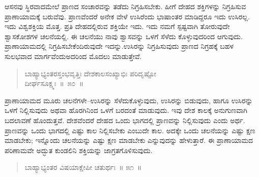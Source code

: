 \vspace{-0.25cm}


\vspace{0.1cm}

ಆಸನವು ಸ್ಥಿರವಾದಮೇಲೆ ಪ್ರಾಣದ ಸಂಚಾರವನ್ನು ತಡೆದು ನಿಗ್ರಹಿಸಬೇಕು. ಹೀಗೆ ದೇಹದ ಶಕ್ತಿಗಳನ್ನು ನಿಗ್ರಹಿಸುವ ಪ್ರಾಣಾಯಾಮಕ್ಕೆ ಬರುವೆವು. ಪ್ರಾಣವೆಂದರೆ ಅನೇಕ ವೇಳೆ ಉಸಿರೆಂದು ಭಾಷಾಂತರ ಮಾಡಿದ್ದರೂ ಇದು ಉಸಿರಲ್ಲ. ಇದು ವಿಶ್ವಶಕ್ತಿಯ ಮೊತ್ತ. ಪ್ರತಿ ದೇಹದಲ್ಲಿರುವ ಶಕ್ತಿಯೇ ಇದು. ಇದು ನಮಗೆ ಸ್ಪಷ್ಟವಾಗಿ ತೋರುವುದೇ ಶ್ವಾಸಕೋಶಗಳ ಚಲನೆಯಲ್ಲಿ. ಈ ಚಲನೆಯು ನಾವು ಶ್ವಾಸವನ್ನು ಒಳಗೆ ಸೆಳೆದು ಕೊಳ್ಳುವುದರಿಂದ ಆಗುವುದು. ಪ್ರಾಣಾಯಾಮದಲ್ಲಿ ನಿಗ್ರಹಿಸಬೇಕೆಂದಿರುವುದೇ ಇದನ್ನು.\break ಉಸಿರನ್ನು ನಿಗ್ರಹಿಸುವುದು ಪ್ರಾಣದ ನಿಗ್ರಹಕ್ಕೆ ಬಹಳ ಸುಲಭವಾದ ಮಾರ್ಗವೆಂದು\break ಅದರಿಂದ ಮೊದಲು ಮಾಡುತ್ತೇವೆ. 

\vspace{-0.3cm}

\begin{verse}
ಬಾಹ್ಯಾಭ್ಯಂತರಸ್ತಂಭವೃತ್ತಿಃ ದೇಶಕಾಲಸಂಖ್ಯಾಭಿಃ ಪರಿದೃಷ್ಟೋ\\
\hspace{6cm} ದೀರ್ಘಸೂಕ್ಷ್ಮಃ~॥~೫೦~॥
\end{verse}

\vspace{-0.35cm}


\vspace{0.1cm}

ಪ್ರಾಣಾಯಾಮದ ಮೂರು ಚಲನೆಗಳೇ–ಉಸಿರನ್ನು ಸೆಳೆದುಕೊಳ್ಳುವುದು, ಉಸಿರನ್ನು ಬಿಡುವುದು, ಹಾಗೂ ಉಸಿರನ್ನು ಒಳಗೆ ನಿಲ್ಲಿಸುವುದು ಅಥವಾ ಹೊರಗಿನಿಂದ ಒಳಗೆ ಬರದಂತೆ ಮಾಡುವುದು. ಇವು ದೇಶ ಕಾಲಕ್ಕೆ ಅನುಗುಣವಾಗಿ ಬದಲಾವಣೆ ಹೊಂದುತ್ತವೆ. ದೇಶವೆಂದರೆ ದೇಹದ ಒಂದು ಭಾಗದಲ್ಲಿ ಪ್ರಾಣವನ್ನು ನಿಲ್ಲಿಸುವುದು ಎಂದು ಅರ್ಥ. ಪ್ರಾಣವನ್ನು ಒಂದು ಭಾಗದಲ್ಲಿ ಎಷ್ಟು ಕಾಲ ನಿಲ್ಲಿಸಬೇಕು ಎಂಬುದೇ ಕಾಲ. ಅದಕ್ಕೇ ಒಂದು ಚಲನೆಯನ್ನು ಎಷ್ಟು ಕ್ಷಣ ಮಾಡಬೇಕು; ಇನ್ನೊಂದು ಚಲನೆಯನ್ನು ಎಷ್ಟು ಕ್ಷಣ ಮಾಡಬೇಕು ಎನ್ನುವುದನ್ನು ಹೇಳುತ್ತಾರೆ. ಈ ಪ್ರಾಣಾಯಾಮದ ಪರಿಣಾಮವೇ ಅದ್ಭುತ ಕುಂಡಲಿನಿ ಶಕ್ತಿಯನ್ನು ಜಾಗ್ರತಗೊಳಿಸುವುದು. 

\vspace{-0.2cm}

\begin{verse}
ಬಾಹ್ಯಾಭ್ಯಂತರ ವಿಷಯಾಕ್ಷೇಪೀ ಚತುರ್ಥಃ~॥ ೫೧~॥
\end{verse}

\vspace{-0.4cm}


